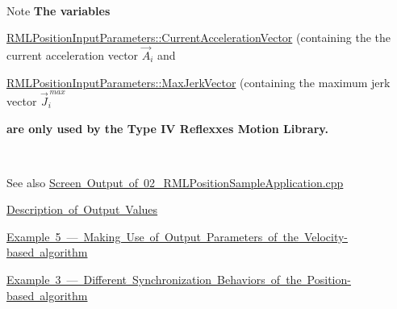 ~\newline
 \begin{DoxyNote}{Note}
{\bfseries{The variables}}~\newline
~\newline

\begin{DoxyItemize}
\item \mbox{\hyperlink{classRMLInputParameters_a423bf4b1ef337cbf6eee22fe2e2502c1}{R\+M\+L\+Position\+Input\+Parameters\+::\+Current\+Acceleration\+Vector}} (containing the the current acceleration vector $ \vec{A}_i$ and~\newline
~\newline
 
\item \mbox{\hyperlink{classRMLInputParameters_a5968ce643868260410f149996c446b66}{R\+M\+L\+Position\+Input\+Parameters\+::\+Max\+Jerk\+Vector}} (containing the maximum jerk vector $ \vec{J}_i^{\,max} $ ~\newline
~\newline
 
\end{DoxyItemize}{\bfseries{are only used by the Type IV Reflexxes Motion Library.}}
\end{DoxyNote}
~\newline
~\newline
 \begin{DoxySeeAlso}{See also}
\mbox{\hyperlink{page_Result_02_RMLPositionSampleApplication}{Screen Output of 02\+\_\+\+R\+M\+L\+Position\+Sample\+Application.\+cpp}} 

\mbox{\hyperlink{page_OutputValues}{Description of Output Values}} 

\mbox{\hyperlink{page_Code_05_RMLVelocitySampleApplication}{Example 5 --- Making Use of Output Parameters of the Velocity-\/based algorithm}} 

\mbox{\hyperlink{page_Code_03_RMLPositionSampleApplication}{Example 3 --- Different Synchronization Behaviors of the Position-\/based algorithm}} 
\end{DoxySeeAlso}
